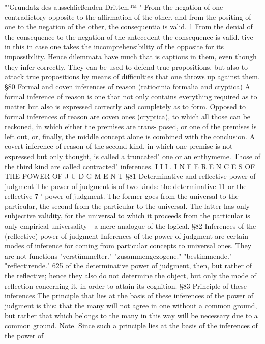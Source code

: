 "'Grundatz des ausschließenden Dritten.™
" From the negation of one contradictory opposite to the affirmation of the other, and from
the positing of one to the negation of the other, the consequentia is valid.
1
From the denial of the consequence to the negation of the antecedent the consequence is
valid.
tive in this in case one takes the incomprehensibility of the opposite for its
impossibility. Hence dilemmata have much that is captious in them, even
though they infer correctly. They can be used to defend true propositions,
but also to attack true propositions by means of difficulties that one throws
up against them.
§80
Formal and coven inferences of reason (ratiocinia formalia and
cryptica)
A formal inference of reason is one that not only contains everything
required as to matter but also is expressed correctly and completely as to
form. Opposed to formal inferences of reason are coven ones (cryptica), to
which all those can be reckoned, in which either the premises are trans-
posed, or one of the premises is left out, or, finally, the middle concept
alone is combined with the conclusion. A covert inference of reason of the
second kind, in which one premise is not expressed but only thought, is
called a truncated" one or an enthymeme. Those of the third kind are called
contracted" inferences.
I I I . I N F E R E N C E S OF THE POWER OF J U D G M E N T
§81
Determinative and reflective power of judgment
The power of judgment is of two kinds: the determinative 11 or the reflective 7 '
power of judgment. The former goes from the universal to the particular, the
second from the particular to the universal. The latter has only subjective
validity, for the universal to which it proceeds from the particular is only
empirical universality - a mere analogue of the logical.
§82
Inferences of the (reflective) power of judgment
Inferences of the power of judgment are certain modes of inference for
coming from particular concepts to universal ones. They are not functions
"verstümmelter."
"zusammengezogene."
"bestimmende."
"reflectirende."
625
of the determinative power of judgment, then, but rather of the reflective;
hence they also do not determine the object, but only the mode of reflection
concerning it, in order to attain its cognition.
§83
Principle of these inferences
The principle that lies at the basis of these inferences of the power of
judgment is this: that the many will not agree in one without a common ground,
but rather that which belongs to the many in this way will be necessary due to a
common ground.
Note.
Since such a principle lies at the basis of the inferences of the power of
